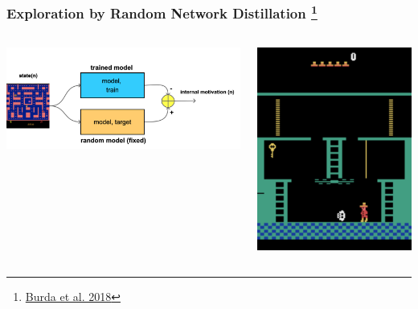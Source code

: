 \documentclass{beamer}
\begin{document}
\begin{frame}
  
  \frametitle{Exploration by Random Network Distillation \footnote{\href{https://arxiv.org/pdf/1810.12894.pdf}{Burda et al. 2018}}}

  \begin{columns}

    \begin{column}{0.5\textwidth}
      \centering
      \includegraphics[scale=0.1]{../diagrams/internal_motivation/rnd.png}
    \end{column}

    \begin{column}{0.5\textwidth}
      \centering
      \includegraphics[scale=0.3]{../images/montezuma.png}
    \end{column}
  
  \end{columns}


\end{frame}
\end{document}
